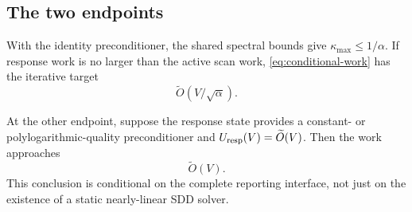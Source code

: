 \subsection{The two endpoints}

With the identity preconditioner, the shared spectral bounds give
$\kappa_{\max}\leq1/\alpha$.  If response work is no larger than the active
scan work, \cref{eq:conditional-work} has the iterative target
\begin{equation}
 \widetilde O(V/\sqrt\alpha).
 \label{eq:iterative-endpoint}
\end{equation}

At the other endpoint, suppose the response state provides a constant- or
polylogarithmic-quality preconditioner and
$U_{\rm resp}(V)=\widetilde O(V)$.  Then the work approaches
\begin{equation}
 \widetilde O(V).
 \label{eq:response-endpoint}
\end{equation}
This conclusion is conditional on the complete reporting interface, not just
on the existence of a static nearly-linear SDD solver.

